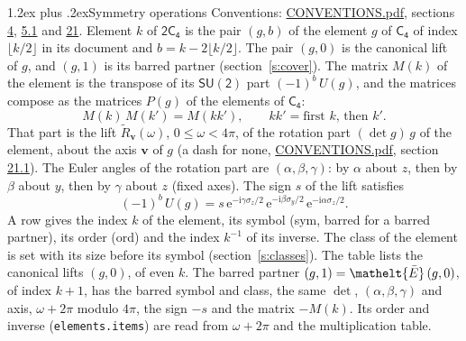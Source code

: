 \documentclass[10pt,a4paper]{article}
\makeatletter
\renewcommand\section{\@startsection{section}{1}{\z@}{-3ex plus -1ex minus -.2ex}%
  {1.2ex plus .2ex}{\normalfont\large\sffamily\bfseries\color{parttitle}}}
\numberwithin{equation}{section}
\newcommand{\eltfont}[1]{{\let\sigma\eltsigma\mathelt{#1}}}
\newcommand{\grp}[1]{\mathsf{#1}}
\newcommand{\elt}[1]{\eltfont{#1}}
\newcommand{\vv}{\mathbf{v}}
\newcommand{\iunit}{\mathrm{i}}
\newcommand{\expe}{\mathrm{e}}
\newcommand{\barred}[1]{\bar{#1}}
\newcommand{\lift}[1]{\tilde{#1}}
\newcommand{\pauli}[1]{\sigma_{#1}}
\makeatother
\begin{document}
\section{Symmetry operations}\label{s:elements}
Conventions: \href{../../CONVENTIONS.pdf}{CONVENTIONS.pdf}, sections \href{../../../rotation/CONVENTIONS.pdf\#conv.4}{4}, \href{../../../rotation/CONVENTIONS.pdf\#conv.5.1}{5.1} and \href{../../CONVENTIONS.pdf\#conv.21}{21}.
\leavevmode\label{n:index.element}\label{n:element.g}Element $k$ of $\grp{2C_{4}}$ is the pair $(g, b)$ of the element $g$ of \href{../../../rotation/data/pdf/C4.pdf}{$\grp{C_{4}}$} of index $\lfloor k/2\rfloor$ in its document and $b = k - 2\lfloor k/2\rfloor$. The pair $(g, 0)$ is the canonical lift of $g$, and $(g, 1)$ is its barred partner (section~\ref{s:cover}). \label{n:matrix.element.pin}\label{n:matrix.element}The matrix $M(k)$ of the element is the transpose of its $\grp{SU(2)}$ part $(-1)^{b}\,U(g)$, and the matrices compose as the matrices $P(g)$ of the elements of $\grp{C_{4}}$:
\begin{equation}\label{e:mprod}M(k)\,M(k') = M(kk'),\qquad kk' = \text{first } k\text{, then } k'.\end{equation}
\leavevmode\label{n:angle.omega}\label{n:vector.axis}\label{n:vector.pole}That part is the lift $\lift{R}_{\vv}(\omega)$, $0 \le \omega < 4\pi$, of the rotation part $(\det g)\,g$ of the element, about the axis $\vv$ of $g$ (a dash for none, \href{../../CONVENTIONS.pdf}{CONVENTIONS.pdf}, section \href{../../CONVENTIONS.pdf\#conv.21.1}{21.1}). \label{n:angle.euler.alpha}\label{n:angle.euler.beta}\label{n:angle.euler.gamma}\label{n:vector.coordinates}The Euler angles of the rotation part are $(\alpha,\beta,\gamma)$: by $\alpha$ about $z$, then by $\beta$ about $y$, then by $\gamma$ about $z$ (fixed axes). \label{n:local.euler.sign}The sign $s$ of the lift satisfies
\begin{equation}\label{e:euler}(-1)^{b}\,U(g) = s\,\expe^{-\iunit\gamma\pauli{z}/2}\,\expe^{-\iunit\beta\pauli{y}/2}\,\expe^{-\iunit\alpha\pauli{z}/2}.\end{equation}
\leavevmode\label{n:index.element.inverse}\label{n:head.sym}\label{n:head.ord}A row gives the index $k$ of the element, its symbol (sym, barred for a barred partner), its order (ord) and the index $k^{-1}$ of its inverse. \label{n:head.class}The class of the element is set with its size before its symbol (section~\ref{s:classes}).
The table lists the canonical lifts $(g, 0)$, of even $k$. The barred partner $(g, 1) = \elt{\barred{E}}\,(g, 0)$, of index $k + 1$, has the barred symbol and class, the same $\det$, $(\alpha,\beta,\gamma)$ and axis, $\omega + 2\pi$ modulo $4\pi$, the sign $-s$ and the matrix $-M(k)$. Its order and inverse (\texttt{elements.items}) are read from $\omega + 2\pi$ and the multiplication table.
\end{document}
